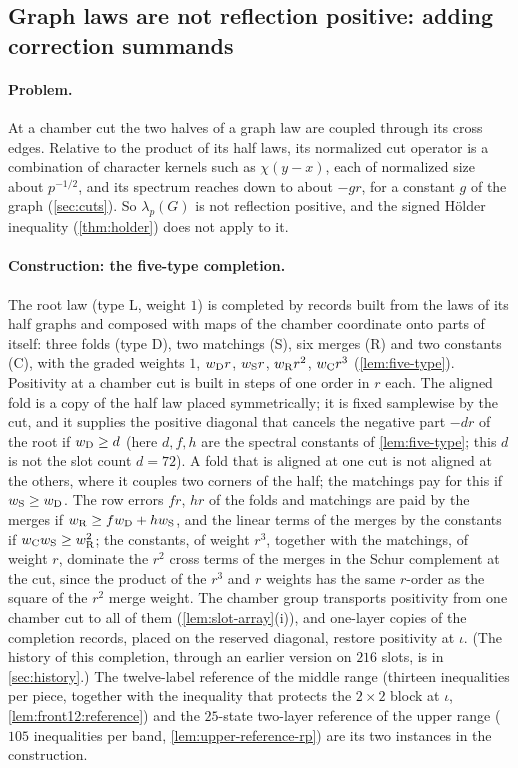 \subsection{Graph laws are not reflection positive: adding correction summands}
\label{subsec:walk:completions}

\paragraph{Problem.}
At a chamber cut the two halves of a graph law are coupled through its cross
edges. Relative to the product of its half laws, its normalized cut operator
is a combination of character kernels such as $\chi(y-x)$, each of normalized
size about $p^{-1/2}$, and its spectrum reaches down to about $-gr$, for a
constant $g$ of the graph (\cref{sec:cuts}). So $\lambda_p(G)$ is not reflection
positive, and the signed H\"older inequality (\cref{thm:holder}) does not apply
to it.

\paragraph{Construction: the five-type completion.}
The root law (type L, weight $1$) is completed by records built from the laws
of its half graphs and composed with maps of the chamber coordinate onto
parts of itself: three folds (type D), two matchings (S), six merges (R) and
two constants (C), with the graded weights $1$, $w_{\rm D}r$, $w_{\rm S}r$,
$w_{\rm R}r^2$, $w_{\rm C}r^3$ (\cref{lem:five-type}).
Positivity at a chamber cut is built in steps of one order in $r$ each. The
aligned fold is a copy of the half law placed symmetrically; it is fixed
samplewise by the cut, and it supplies the positive diagonal that cancels the
negative part $-dr$ of the root if $w_{\rm D}\ge d$ (here
$d,f,h$ are the spectral constants of \cref{lem:five-type}; this
$d$ is not the slot count $d=72$). A fold that is aligned at
one cut is not aligned at the others, where it couples two corners of the
half; the matchings pay for this if $w_{\rm S}\ge w_{\rm D}$. The row errors
$fr$, $hr$ of the folds and matchings are paid by the merges if
$w_{\rm R}\ge fw_{\rm D}+hw_{\rm S}$, and the linear terms of the merges by the
constants if $w_{\rm C}w_{\rm S}\ge w_{\rm R}^2$; the constants, of
weight $r^3$, together with the matchings, of weight $r$, dominate
the $r^2$ cross terms of the merges in the Schur complement at the
cut, since the product of the $r^3$ and $r$ weights has the same
$r$-order as the square of the $r^2$ merge weight. The chamber group transports
positivity from one chamber cut to all of them (\cref{lem:slot-array}(i)), and
one-layer copies of the completion records, placed on the reserved diagonal, restore
positivity at $\iota$. (The history of this completion, through
an earlier version on $216$ slots, is in \cref{sec:history}.) The
twelve-label reference of the middle range (thirteen inequalities
per piece, together with the inequality that protects the
$2\times2$ block at $\iota$, \cref{lem:front12:reference}) and
the $25$-state two-layer reference of the upper range ($105$
inequalities per band, \cref{lem:upper-reference-rp}) are its two
instances in the construction.

